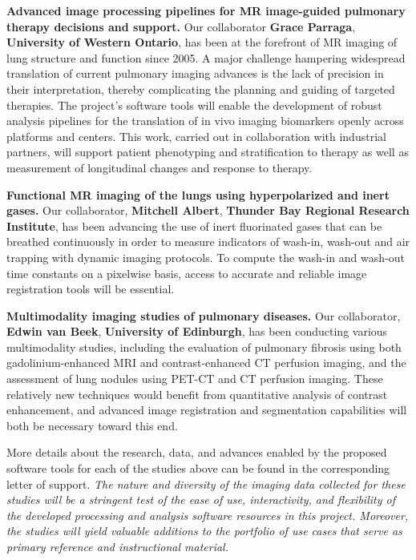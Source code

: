 \documentclass[11pt,]{article}
\begin{document}
\textbf{Advanced image processing pipelines for MR image-guided
pulmonary therapy decisions and support.} Our collaborator \textbf{Grace
Parraga}, \textbf{University of Western Ontario}, has been at the
forefront of MR imaging of lung structure and function since 2005. A
major challenge hampering widespread translation of current pulmonary
imaging advances is the lack of precision in their interpretation,
thereby complicating the planning and guiding of targeted therapies. The
project's software tools will enable the development of robust analysis
pipelines for the translation of in vivo imaging biomarkers openly
across platforms and centers. This work, carried out in collaboration
with industrial partners, will support patient phenotyping and
stratification to therapy as well as measurement of longitudinal changes
and response to therapy.

\textbf{Functional MR imaging of the lungs using hyperpolarized and
inert gases.} Our collaborator, \textbf{Mitchell Albert},
\textbf{Thunder Bay Regional Research Institute}, has been advancing the
use of inert fluorinated gases that can be breathed continuously in
order to measure indicators of wash-in, wash-out and air trapping with
dynamic imaging protocols. To compute the wash-in and wash-out time
constants on a pixelwise basis, access to accurate and reliable image
registration tools will be essential.

\textbf{Multimodality imaging studies of pulmonary diseases.} Our
collaborator, \textbf{Edwin van Beek}, \textbf{University of Edinburgh},
has been conducting various multimodality studies, including the
evaluation of pulmonary fibrosis using both gadolinium-enhanced MRI and
contrast-enhanced CT perfusion imaging, and the assessment of lung
nodules using PET-CT and CT perfusion imaging. These relatively new
techniques would benefit from quantitative analysis of contrast
enhancement, and advanced image registration and segmentation
capabilities will both be necessary toward this end.

More details about the research, data, and advances enabled by the
proposed software tools for each of the studies above can be found in
the corresponding letter of support. \emph{The nature and diversity of
the imaging data collected for these studies will be a stringent test of
the ease of use, interactivity, and flexibility of the developed
processing and analysis software resources in this project. Moreover,
the studies will yield valuable additions to the portfolio of use cases
that serve as primary reference and instructional material.}
\end{document}
